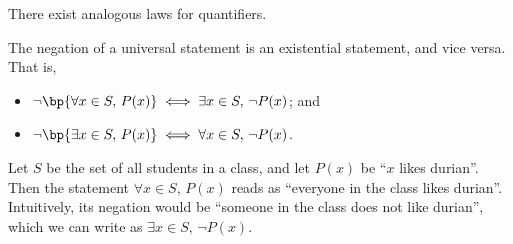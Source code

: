 There exist analogous laws for quantifiers.

\begin{proposition}
    The negation of a universal statement is an existential statement, and vice versa. That is,
    \begin{itemize}
        \item $\lnot \bp{\forall x \in S, \, P(x)} \iff \exists x \in S, \, \lnot P(x)$; and
        \item $\lnot \bp{\exists x \in S, \, P(x)} \iff \forall x \in S, \, \lnot P(x)$.
    \end{itemize}
\end{proposition}

\begin{example}
    Let $S$ be the set of all students in a class, and let $P(x)$ be ``$x$ likes durian''. Then the statement $\forall x \in S, \, P(x)$ reads as ``everyone in the class likes durian''. Intuitively, its negation would be ``someone in the class does not like durian'', which we can write as $\exists x \in S, \, \lnot P(x)$.
\end{example}